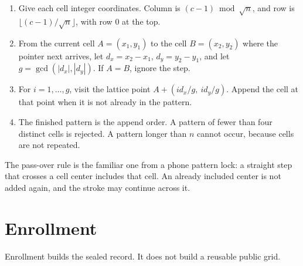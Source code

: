 \documentclass[11pt]{article}
\begin{document}
\begin{enumerate}
  \item Give each cell integer coordinates.
        Column is \((c-1) \bmod \sqrt{n}\), and row is \(\lfloor (c-1)/\sqrt{n} \rfloor\), with row \(0\) at the top.
  \item From the current cell \(A = (x_1,y_1)\) to the cell \(B = (x_2,y_2)\) where the pointer next arrives, let \(d_x = x_2-x_1\), \(d_y = y_2-y_1\), and let \(g = \gcd(|d_x|,|d_y|)\).
        If \(A = B\), ignore the step.
  \item For \(i = 1, \ldots, g\), visit the lattice point \(A + (i d_x/g,\ i d_y/g)\).
        Append the cell at that point when it is not already in the pattern.
  \item The finished pattern is the append order.
        A pattern of fewer than four distinct cells is rejected.
        A pattern longer than \(n\) cannot occur, because cells are not repeated.
\end{enumerate}

The pass-over rule is the familiar one from a phone pattern lock: a straight step that crosses a cell center includes that cell.
An already included center is not added again, and the stroke may continue across it.

\section{Enrollment}

Enrollment builds the sealed record.
It does not build a reusable public grid.
\end{document}
